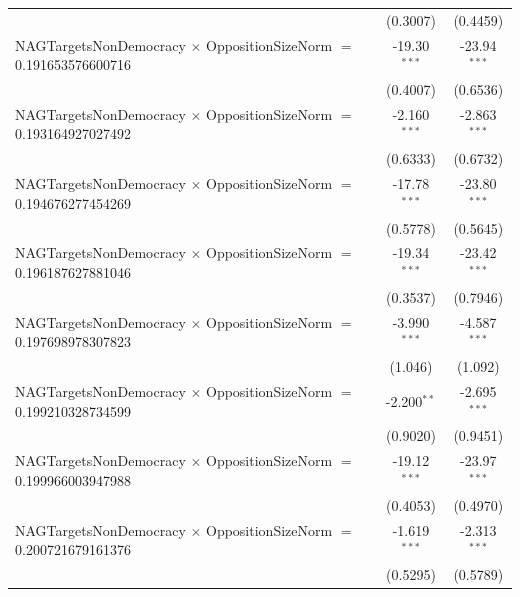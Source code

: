 \begin{tabular}{lcc}
                                                                                & (0.3007)             & (0.4459)\\   
   NAGTargetsNonDemocracy $\times$ OppositionSizeNorm $=$ 0.191653576600716     & -19.30$^{***}$       & -23.94$^{***}$\\   
                                                                                & (0.4007)             & (0.6536)\\   
   NAGTargetsNonDemocracy $\times$ OppositionSizeNorm $=$ 0.193164927027492     & -2.160$^{***}$       & -2.863$^{***}$\\   
                                                                                & (0.6333)             & (0.6732)\\   
   NAGTargetsNonDemocracy $\times$ OppositionSizeNorm $=$ 0.194676277454269     & -17.78$^{***}$       & -23.80$^{***}$\\   
                                                                                & (0.5778)             & (0.5645)\\   
   NAGTargetsNonDemocracy $\times$ OppositionSizeNorm $=$ 0.196187627881046     & -19.34$^{***}$       & -23.42$^{***}$\\   
                                                                                & (0.3537)             & (0.7946)\\   
   NAGTargetsNonDemocracy $\times$ OppositionSizeNorm $=$ 0.197698978307823     & -3.990$^{***}$       & -4.587$^{***}$\\   
                                                                                & (1.046)              & (1.092)\\   
   NAGTargetsNonDemocracy $\times$ OppositionSizeNorm $=$ 0.199210328734599     & -2.200$^{**}$        & -2.695$^{***}$\\   
                                                                                & (0.9020)             & (0.9451)\\   
   NAGTargetsNonDemocracy $\times$ OppositionSizeNorm $=$ 0.199966003947988     & -19.12$^{***}$       & -23.97$^{***}$\\   
                                                                                & (0.4053)             & (0.4970)\\   
   NAGTargetsNonDemocracy $\times$ OppositionSizeNorm $=$ 0.200721679161376     & -1.619$^{***}$       & -2.313$^{***}$\\   
                                                                                & (0.5295)             & (0.5789)\\   

\end{tabular}
